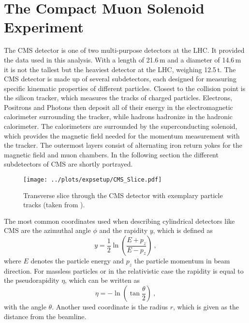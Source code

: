 \section{The Compact Muon Solenoid Experiment}
The CMS detector is one of two multi-purpose detectors at the LHC. It provided the data used in this analysis. With a length of 21.6\,m and a diameter of 14.6\,m it is not the tallest but the heaviest detector at the LHC, weighing 12.5\,t.
The CMS detector is made up of several subdetectors, each designed for measuring specific kinematic properties of different particles. Closest to the collision point is the silicon tracker, which measures the tracks of charged particles. Electrons, Positrons and Photons then deposit all of their energy in the electromagnetic calorimeter surrounding the tracker, while hadrons hadronize in the hadronic calorimeter. The calorimeters are surrounded by the superconducting solenoid, which provides the magnetic field needed for the momentum measurement with the tracker. The outermost layers consist of alternating iron return yokes for the magnetic field and muon chambers. In the following section the different subdetectors of CMS are shortly portrayed.\\
\begin{figure}
	\centering
	\texttt{[image: ../plots/expsetup/CMS\_Slice.pdf]}
	\caption[Transverse slice through the CMS detector]{Transverse slice through the CMS detector with exemplary particle tracks (taken from \cite{cms_slice}).}
	\label{fig:expsetup:cms_slice}
\end{figure}

\noindent The most common coordinates used when describing cylindrical detectors like CMS are the azimuthal angle $\phi$ and the rapidity $y$, which is defined as
\begin{equation}
y = \frac{1}{2} \ln \left( \frac{E+p_z}{E-p_z} \right) ~,
\end{equation}
where $E$ denotes the particle energy and $p_z$ the particle momentum in beam direction. For massless particles or in the relativistic case the rapidity is equal to the pseudorapidity $\eta$, which can be written as
\begin{equation}
\eta = -\ln \left( \tan \frac{\theta}{2} \right) ~,
\end{equation}
with the angle $\theta$. Another used coordinate is the radius $r$, which is given as the distance from the beamline.
